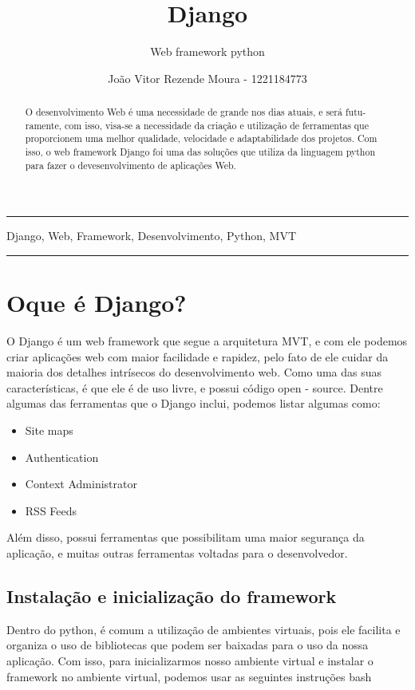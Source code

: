 \documentclass[12pt, a4paper]{paper}
\title{Django \\
  \vspace{-3cm}
}
\subtitle{Web framework python}
\author{João Vitor Rezende Moura - 1221184773}
\begin{document}
\maketitle
\hrule
\begin{abstract}
  O desenvolvimento Web é uma necessidade de grande nos dias atuais, e será futu-
  ramente, com isso, visa-se a necessidade da criação e utilização de ferramentas que
  proporcionem uma melhor qualidade, velocidade e adaptabilidade dos projetos.
  Com isso, o web framework Django foi uma das soluções que utiliza da linguagem
  python para fazer o devesenvolvimento de aplicações Web.
\end{abstract}
\vspace{-0.6cm}


\begin{keywords}
  Django, Web, Framework, Desenvolvimento, Python, MVT
\end{keywords}
\hrule
\section{Oque é Django?} %
\label{sec:Oque é Django?}
O Django é um web framework que segue a arquitetura MVT, e com ele
podemos criar aplicações web com maior facilidade e rapidez, pelo fato de
ele cuidar da maioria dos detalhes intrísecos do desenvolvimento web. Como
uma das suas características, é que ele é de uso livre, e possui código open -
source.
Dentre algumas das ferramentas que o Django inclui, podemos listar algumas como:

\begin{itemize}
  \item Site maps
  \item Authentication
  \item Context Administrator
  \item RSS Feeds
\end{itemize}

Além disso, possui ferramentas que possibilitam uma maior segurança da
aplicação, e muitas outras ferramentas voltadas para o desenvolvedor.


\subsection{Instalação e inicialização do framework} %
\label{sub:Instalação e inicialização do framework}
Dentro do python, é comum a utilização de ambientes virtuais, pois ele facilita
e organiza o uso de bibliotecas que podem ser baixadas para o uso da nossa
aplicação. Com isso, para inicializarmos nosso ambiente virtual e instalar o
framework no ambiente virtual, podemos usar as seguintes instruções bash
\end{document}
